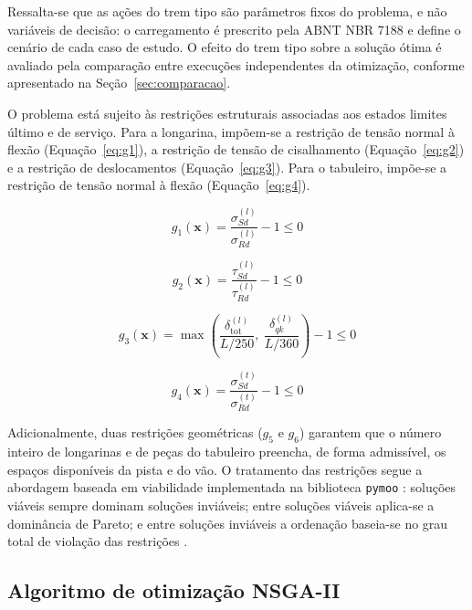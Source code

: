 Ressalta-se que as ações do trem tipo são parâmetros fixos do problema, e não variáveis de decisão: o carregamento é prescrito pela ABNT NBR 7188 \parencite{nbr7188} e define o cenário de cada caso de estudo. O efeito do trem tipo sobre a solução ótima é avaliado pela comparação entre execuções independentes da otimização, conforme apresentado na Seção~\ref{sec:comparacao}.

O problema está sujeito às restrições estruturais associadas aos estados limites último e de serviço. Para a longarina, impõem-se a restrição de tensão normal à flexão (Equação~\eqref{eq:g1}), a restrição de tensão de cisalhamento (Equação~\eqref{eq:g2}) e a restrição de deslocamentos (Equação~\eqref{eq:g3}). Para o tabuleiro, impõe-se a restrição de tensão normal à flexão (Equação~\eqref{eq:g4}).

\begin{equation}
g_{1}(\mathbf{x}) = \frac{\sigma_{Sd}^{(l)}}{\sigma_{Rd}^{(l)}} - 1 \leq 0
\label{eq:g1}
\end{equation}

\begin{equation}
g_{2}(\mathbf{x}) = \frac{\tau_{Sd}^{(l)}}{\tau_{Rd}^{(l)}} - 1 \leq 0
\label{eq:g2}
\end{equation}

\begin{equation}
g_{3}(\mathbf{x}) = \max\left(\frac{\delta_{\mathrm{tot}}^{(l)}}{L/250},\ \frac{\delta_{qk}^{(l)}}{L/360}\right) - 1 \leq 0
\label{eq:g3}
\end{equation}

\begin{equation}
g_{4}(\mathbf{x}) = \frac{\sigma_{Sd}^{(t)}}{\sigma_{Rd}^{(t)}} - 1 \leq 0
\label{eq:g4}
\end{equation}

Adicionalmente, duas restrições geométricas ($g_5$ e $g_6$) garantem que o número inteiro de longarinas e de peças do tabuleiro preencha, de forma admissível, os espaços disponíveis da pista e do vão. O tratamento das restrições segue a abordagem baseada em viabilidade implementada na biblioteca \texttt{pymoo} \parencite{blank2020}: soluções viáveis sempre dominam soluções inviáveis; entre soluções viáveis aplica-se a dominância de Pareto; e entre soluções inviáveis a ordenação baseia-se no grau total de violação das restrições \parencite{DEB2009}.

\subsection{Algoritmo de otimização NSGA-II}\label{sec:nsga2}

